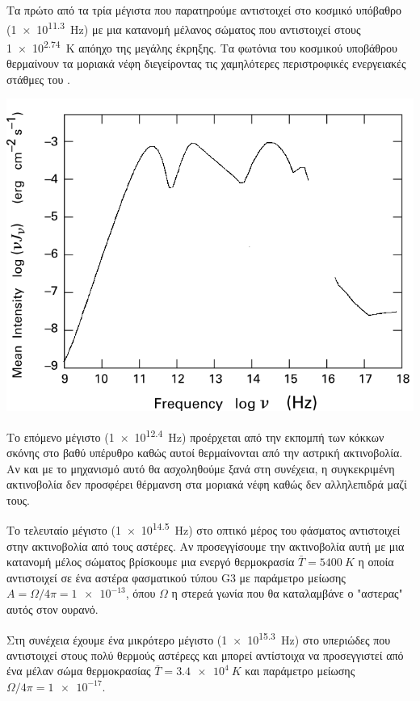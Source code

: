 Τα πρώτο από τα τρία μέγιστα που παρατηρούμε αντιστοιχεί στο κοσμικό υπόβαθρο (\SI{1e11.3}{Hz}) με μια κατανομή μέλανος σώματος που αντιστοιχεί στους \SI{1e2.74}{K} απόηχο της μεγάλης έκρηξης. Τα φωτόνια του κοσμικού υποβάθρου θερμαίνουν τα μοριακά νέφη διεγείροντας τις χαμηλότερες περιστροφικές ενεργειακές στάθμες του .

\begin{marginfigure}
	\centering
	\includegraphics[width=1\linewidth]{Images/interstellarradiation}
	\caption{}
	\label{fig:interstellarradiation}
\end{marginfigure}

Το επόμενο μέγιστο (\SI{1e12.4}{Hz}) προέρχεται από την εκπομπή των κόκκων σκόνης στο βαθύ υπέρυθρο καθώς αυτοί θερμαίνονται από την αστρική ακτινοβολία. Αν και με το μηχανισμό αυτό θα ασχοληθούμε ξανά στη συνέχεια, η συγκεκριμένη ακτινοβολία δεν προσφέρει θέρμανση στα μοριακά νέφη καθώς δεν αλληλεπιδρά μαζί τους.

Το τελευταίο μέγιστο (\SI{1e14.5}{Hz}) στο οπτικό μέρος του φάσματος αντιστοιχεί στην ακτινοβολία από τους αστέρες. Αν προσεγγίσουμε την ακτινοβολία αυτή με μια κατανομή μέλος σώματος βρίσκουμε μια ενεργό θερμοκρασία $\bar{T}=\SI{5400}{K}$ η οποία αντιστοιχεί σε ένα αστέρα φασματικού τύπου G3 με παράμετρο μείωσης $A=\Omega/4\pi= \num{1e-13}$, όπου $\Omega$ η στερεά γωνία που θα καταλαμβάνε ο "αστερας" αυτός στον ουρανό.

Στη συνέχεια έχουμε ένα μικρότερο μέγιστο (\SI{1e15.3}{Hz}) στο υπεριώδες που αντιστοιχεί στους πολύ θερμούς αστέρεςς και μπορεί αντίστοιχα να προσεγγιστεί από ένα μέλαν σώμα θερμοκρασίας $\bar{T}=\SI{3.4e4}{K}$ και παράμετρο μείωσης  $\Omega/4\pi= \num{1e-17}$. 

